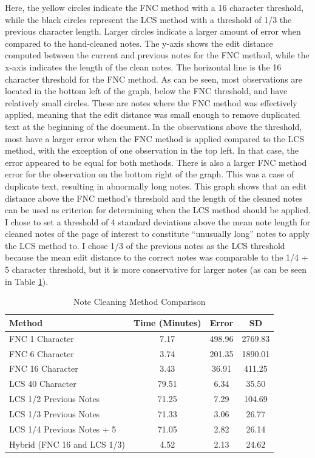 \documentclass[print]{nuthesis}
\begin{document}
Here, the yellow circles indicate the FNC method with a 16 character threshold, while the black circles represent the LCS method with a threshold of 1/3 the previous character length.
Larger circles indicate a larger amount of error when compared to the hand-cleaned notes.
The y-axis shows the edit distance computed between the current and previous notes for the FNC method, while the x-axis indicates the length of the clean notes.
The horizontal line is the 16 character threshold for the FNC method.
As can be seen, most observations are located in the bottom left of the graph, below the FNC threshold, and have relatively small circles.
These are notes where the FNC method was effectively applied, meaning that the edit distance was small enough to remove duplicated text at the beginning of the document.
In the observations above the threshold, most have a larger error when the FNC method is applied compared to the LCS method, with the exception of one observation in the top left.
In that case, the error appeared to be equal for both methods.
There is also a larger FNC method error for the observation on the bottom right of the graph.
This was a case of duplicate text, resulting in abnormally long notes.
This graph shows that an edit distance above the FNC method's threshold and the length of the cleaned notes can be used as criterion for determining when the LCS method should be applied.
I chose to set a threshold of 4 standard deviations above the mean note length for cleaned notes of the page of interest to constitute ``unusually long'' notes to apply the LCS method to.
I chose 1/3 of the previous notes as the LCS threshold because the mean edit distance to the correct notes was comparable to the 1/4 + 5 character threshold, but it is more conservative for larger notes (as can be seen in Table \ref{tab:cleancompare}).

\begin{table}

\caption{\label{tab:cleancompare}Note Cleaning Method Comparison}
\centering
\begin{tabular}[t]{l|c|c|c}
\hline
Method & Time (Minutes) & Error & SD\\
\hline
FNC 1 Character & 7.17 & 498.96 & 2769.83\\
\hline
FNC 6 Character & 3.74 & 201.35 & 1890.01\\
\hline
FNC 16 Character & 3.43 & 36.91 & 411.25\\
\hline
LCS 40 Character & 79.51 & 6.34 & 35.50\\
\hline
LCS 1/2 Previous Notes & 71.25 & 7.29 & 104.69\\
\hline
LCS 1/3 Previous Notes & 71.33 & 3.06 & 26.77\\
\hline
LCS 1/4 Previous Notes + 5 & 71.05 & 2.82 & 26.14\\
\hline
Hybrid (FNC 16 and LCS 1/3) & 4.52 & 2.13 & 24.62\\
\hline
\end{tabular}
\end{table}
\end{document}
